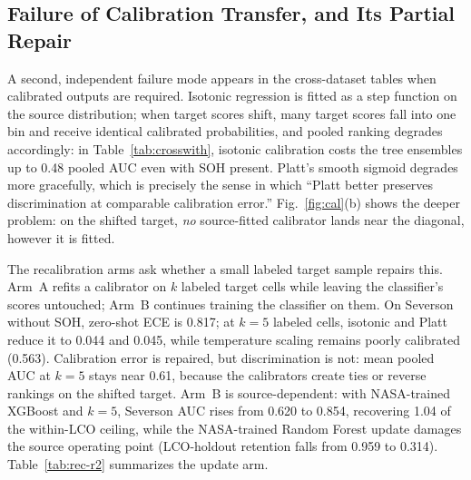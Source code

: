 \documentclass[IJPHM, 2014, 00]{PHMSociety}
\begin{document}
\subsection{Failure of Calibration Transfer, and Its Partial Repair}
A second, independent failure mode appears in the cross-dataset tables when calibrated outputs are required. Isotonic regression is fitted as a step function on the source distribution; when target scores shift, many target scores fall into one bin and receive identical calibrated probabilities, and pooled ranking degrades accordingly: in Table~\ref{tab:crosswith}, isotonic calibration costs the tree ensembles up to 0.48 pooled AUC even with SOH present. Platt's smooth sigmoid degrades more gracefully, which is precisely the sense in which ``Platt better preserves discrimination at comparable calibration error.'' Fig.~\ref{fig:cal}(b) shows the deeper problem: on the shifted target, \emph{no} source-fitted calibrator lands near the diagonal, however it is fitted.

The recalibration arms ask whether a small labeled target sample repairs this. Arm~A refits a calibrator on $k$ labeled target cells while leaving the classifier's scores untouched; Arm~B continues training the classifier on them. On Severson without SOH, zero-shot ECE is 0.817; at $k{=}5$ labeled cells, isotonic and Platt reduce it to 0.044 and 0.045, while temperature scaling remains poorly calibrated (0.563). Calibration error is repaired, but discrimination is not: mean pooled AUC at $k{=}5$ stays near 0.61, because the calibrators create ties or reverse rankings on the shifted target. Arm~B is source-dependent: with NASA-trained XGBoost and $k{=}5$, Severson AUC rises from 0.620 to 0.854, recovering 1.04 of the within-LCO ceiling, while the NASA-trained Random Forest update damages the source operating point (LCO-holdout retention falls from 0.959 to 0.314). Table~\ref{tab:rec-r2} summarizes the update arm.



\begin{table}[!t]
\caption{Arm B Recovery at $k=5$ on Severson Without SOH, $H=20$. Recovery Ratio Uses the Within-LCO Ceiling; Retention Is the LCO-Holdout AUC Before and After the Update.}
\label{tab:rec-r2}
\centering
{}
\end{table}
\end{document}
